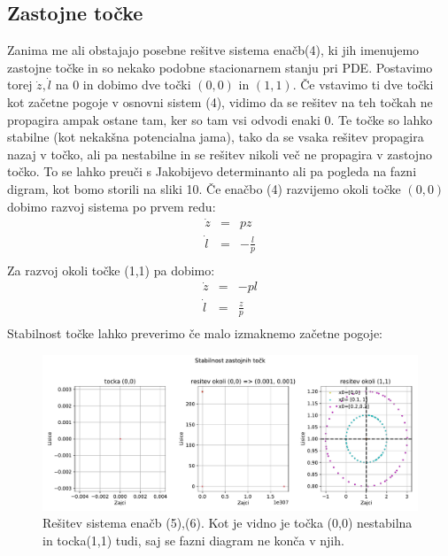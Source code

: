 \documentclass[11pt, a4paper]{article}
\begin{document}
\subsection{Zastojne točke}
Zanima me ali obstajajo posebne rešitve sistema enačb(4), ki jih imenujemo zastojne točke in so nekako podobne stacionarnem stanju pri PDE. Postavimo torej $\dot{z}, \dot{l}$ na $0$ in dobimo dve točki $(0,0)$ in $(1,1)$. Če vstavimo ti dve točki kot začetne pogoje v osnovni sistem (4), vidimo da se rešitev na teh točkah ne propagira ampak ostane tam, ker so tam vsi odvodi enaki 0. Te točke so lahko stabilne (kot nekakšna potencialna jama), tako da se vsaka rešitev propagira nazaj v točko, ali pa nestabilne in se rešitev nikoli več ne propagira v zastojno točko. To se lahko preuči s Jakobijevo determinanto ali pa pogleda na fazni digram, kot bomo storili na sliki 10. Če enačbo (4) razvijemo okoli točke $(0,0)$ dobimo razvoj sistema po prvem redu:
\begin{equation}
\begin{array} {lcl} \dot{z} & = & pz \\
\dot{l}  & = & -\frac{l}{p}\\
 \end{array}
\end{equation} 
Za razvoj okoli točke (1,1) pa dobimo:
\begin{equation}
\begin{array} {lcl} \dot{z} & = & -p l \\
\dot{l}  & = & \frac{z}{p}\\
 \end{array}
\end{equation} 
Stabilnost točke lahko preverimo če malo izmaknemo začetne pogoje:
\begin{figure}[htb!]
  \centering
  \includegraphics[width=18cm]{zajci_stabilnost1.pdf}
  \caption{Rešitev sistema enačb (5),(6). Kot je vidno je točka (0,0) nestabilna in tocka(1,1) tudi, saj se fazni diagram ne konča v njih.}
\end{figure}
\end{document}
